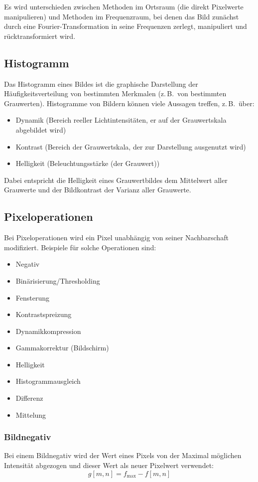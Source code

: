 \documentclass[a4paper, 11pt, accentcolor = tud3b]{tudreport}
\newcommand{\zB}{z.\,B.~}
\begin{document}
			Es wird unterschieden zwischen Methoden im Ortsraum (die direkt Pixelwerte manipulieren) und Methoden im Frequenzraum, bei denen das Bild zunächst durch eine Fourier-Transformation in seine Frequenzen zerlegt, manipuliert und rücktransformiert wird.

			\subsection{Histogramm}
				Das Histogramm eines Bildes ist die graphische Darstellung der Häufigkeitsverteilung von bestimmten Merkmalen (\zB von bestimmten Grauwerten). Histogramme von Bildern können viele Aussagen treffen, \zB über:
				\begin{itemize}
					\item Dynamik (Bereich reeller Lichtintensitäten, er auf der Grauwertskala abgebildet wird)
					\item Kontrast (Bereich der Grauwertskala, der zur Darstellung ausgenutzt wird)
					\item Helligkeit (Beleuchtungsstärke (der Grauwert))
				\end{itemize}
				Dabei entspricht die Helligkeit eines Grauwertbildes dem Mittelwert aller Grauwerte und der Bildkontrast der Varianz aller Grauwerte.

			\subsection{Pixeloperationen}
				Bei Pixeloperationen wird ein Pixel unabhängig von seiner Nachbarschaft modifiziert. Beispiele für solche Operationen sind:
				\begin{itemize}
					\item Negativ
					\item Binärisierung/Thresholding
					\item Fensterung
					\item Kontrastspreizung
					\item Dynamikkompression
					\item Gammakorrektur (Bildschirm)
					\item Helligkeit
					\item Histogrammausgleich
					\item Differenz
					\item Mittelung
				\end{itemize}

				\subsubsection{Bildnegativ}
					Bei einem Bildnegativ wird der Wert eines Pixels von der Maximal möglichen Intensität abgezogen und dieser Wert als neuer Pixelwert verwendet:
					\begin{equation*}
						g[m, n] = f_\text{max} - f[m, n]
					\end{equation*}
\end{document}
